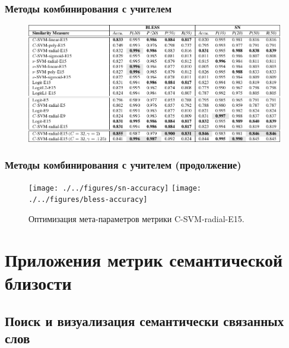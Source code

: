 \documentclass{beamer}
\begin{document}
\begin{frame}
\frametitle{Методы комбинирования с учителем}

	\begin{figure}
	\centering
		\includegraphics[width=1.0\textwidth]{figures/hybrid-table}
		
\end{figure}
\end{frame}


\begin{frame}
\frametitle{Методы комбинирования с учителем (продолжение)}
\begin{figure}
\centering
\texttt{[image: ./../figures/sn-accuracy]}
\texttt{[image: ./../figures/bless-accuracy]}
     
\caption{ Оптимизация мета-параметров метрики C-SVM-radial-E15.  }
\label{fig:radial-optimization}
\end{figure}
\end{frame}


\section[Приложения]{Приложения метрик семантической близости}
\subsection{Поиск и визуализация семантически связанных слов}

  
\end{document}
